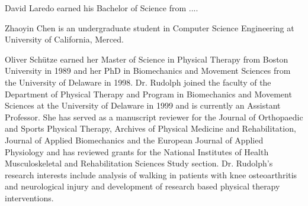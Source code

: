 
\begin{biography}{David Laredo}
earned his Bachelor of Science from ....
\end{biography}

\begin{biography}{Zhaoyin Chen}
is an undergraduate student in Computer Science Engineering at University of California, Merced.
\end{biography}

\begin{biography}{Oliver Sch\"utze}
earned her Master of Science in Physical Therapy from Boston University in 1989 and her PhD in Biomechanics and Movement Sciences from the University of Delaware in 1998.  Dr. Rudolph joined the faculty of the Department of Physical Therapy and Program in Biomechanics and Movement Sciences at the University of Delaware in 1999 and is currently an Assistant Professor.  She has served as a manuscript reviewer for the Journal of Orthopaedic and Sports Physical Therapy, Archives of Physical Medicine and Rehabilitation, Journal of Applied Biomechanics and the European Journal of Applied Physiology and has reviewed grants for the National Institutes of Health Musculoskeletal and Rehabilitation Sciences Study section. Dr. Rudolph's research interests include analysis of walking in patients with knee osteoarthritis and neurological injury and development of research based physical therapy interventions.
\end{biography}


